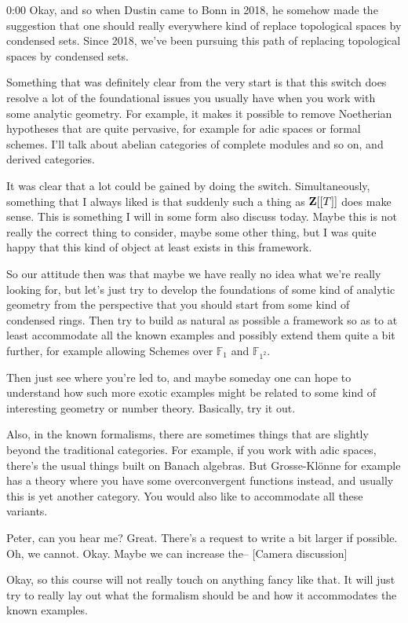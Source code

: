\begin{unfinished}{0:00}
Okay, and so when Dustin came to Bonn in 2018, he somehow made the suggestion that one should really everywhere kind of replace topological spaces by condensed sets. Since 2018, we've been pursuing this path of replacing topological spaces by condensed sets.

Something that was definitely clear from the very start is that this switch does resolve a lot of the foundational issues you usually have when you work with some analytic geometry. For example, it makes it possible to remove Noetherian hypotheses that are quite pervasive, for example for adic spaces or formal schemes. I'll talk about abelian categories of complete modules and so on, and derived categories.

It was clear that a lot could be gained by doing the switch. Simultaneously, something that I always liked is that suddenly such a thing as $\mathbf Z[[T]]$ does make sense. This is something I will in some form also discuss today. Maybe this is not really the correct thing to consider, maybe some other thing, but I was quite happy that this kind of object at least exists in this framework.

So our attitude then was that maybe we have really no idea what we're really looking for, but let's just try to develop the foundations of some kind of analytic geometry from the perspective that you should start from some kind of condensed rings. Then try to build as natural as possible a framework so as to at least accommodate all the known examples and possibly extend them quite a bit further, for example allowing Schemes over $\mathbb{F}_1$ and $\mathbb{F}_{1^2}$.

Then just see where you're led to, and maybe someday one can hope to understand how such more exotic examples might be related to some kind of interesting geometry or number theory. Basically, try it out.

Also, in the known formalisms, there are sometimes things that are slightly beyond the traditional categories. For example, if you work with adic spaces, there's the usual things built on Banach algebras. But Grosse-Klönne for example has a theory where you have some overconvergent functions instead, and usually this is yet another category. You would also like to accommodate all these variants.

Peter, can you hear me? Great. There's a request to write a bit larger if possible. Oh, we cannot. Okay. Maybe we can increase the-- [Camera discussion]

Okay, so this course will not really touch on anything fancy like that. It will just try to really lay out what the formalism should be and how it accommodates the known examples.


\end{unfinished}
